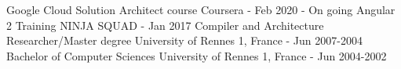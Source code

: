\begin{cvskills}
\cvskill
{Google Cloud Solution Architect course} %
{Coursera - Feb 2020 - On going} %
\cvskill
{Angular 2 Training} %
{NINJA SQUAD - Jan 2017} %
\cvskill
{Compiler and Architecture Researcher/Master degree} %
{University of Rennes 1, France - Jun 2007-2004} %
\cvskill
{Bachelor of Computer Sciences} %
{University of Rennes 1, France - Jun 2004-2002} %
\end{cvskills}  
